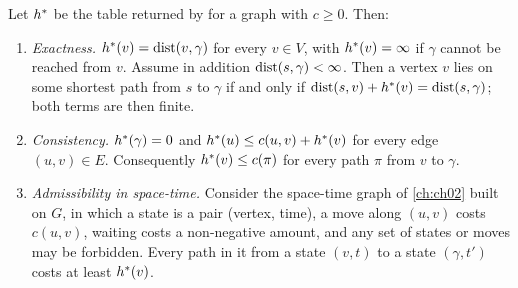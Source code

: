 \begin{theorem}
\label{thm:ch03-true-distance}
%
Let $h^*$ be the table returned by  for a graph with $c\ge0$.
Then:
\begin{enumerate}
  \item \emph{Exactness.} $h^*(v)=\operatorname{dist}(v,\gamma)$ for every $v\in V$, with
$h^*(v)=\infty$ if $\gamma$ cannot be reached from $v$. Assume in addition
$\operatorname{dist}(s,\gamma)<\infty$. Then a vertex $v$ lies on some shortest path from $s$ to $\gamma$ if and only
if $\operatorname{dist}(s,v)+h^*(v)=\operatorname{dist}(s,\gamma)$; both terms are then finite.
  \item \emph{Consistency.} $h^*(\gamma)=0$ and $h^*(u)\le c(u,v)+h^*(v)$ for every
edge $(u,v)\in E$. Consequently $h^*(v)\le c(\pi)$ for every path $\pi$ from $v$ to $\gamma$.
  \item \emph{Admissibility in space-time.} Consider the space-time graph of \cref{ch:ch02}
built on $G$, in which a state is a pair (vertex, time), a move along $(u,v)$ costs $c(u,v)$,
waiting costs a non-negative amount, and any set of states or moves may be forbidden. Every
path in it from a state $(v,t)$ to a state $(\gamma,t')$ costs at least $h^*(v)$.
\end{enumerate}
\end{theorem}
